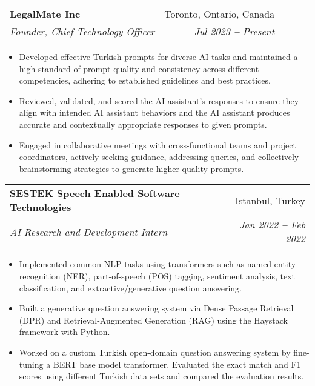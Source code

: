 \documentclass[letterpaper,11pt]{article}
\makeatletter
\newcommand{\resumeItem}[1]{
  \item\small{
    {#1 \vspace{-2pt}}
  }
}
\newcommand{\resumeSubheading}[4]{
  \vspace{-2pt}\item
    \begin{tabular*}{0.97\textwidth}[t]{l@{\extracolsep{\fill}}r}
      \textbf{#1} & #2 \\
      \textit{\small#3} & \textit{\small #4} \\
    \end{tabular*}\vspace{-7pt}
}
\newcommand{\resumeItemListStart}{\begin{itemize}}
\newcommand{\resumeItemListEnd}{\end{itemize}\vspace{-5pt}}
\makeatother
\begin{document}
    \resumeSubheading
      {LegalMate Inc}{Toronto, Ontario, Canada}
      {Founder, Chief Technology Officer}{Jul 2023 \textbf{--} Present}
        \resumeItemListStart
            \resumeItem{Developed effective Turkish prompts for diverse AI tasks and maintained a high standard of prompt quality and consistency across different competencies, adhering to established guidelines and best practices.}
            \resumeItem{Reviewed, validated, and scored the AI assistant's responses to ensure they align with intended AI assistant behaviors and the AI assistant produces accurate and contextually appropriate responses to given prompts.}
            \resumeItem{Engaged in collaborative meetings with cross-functional teams and project coordinators, actively seeking guidance, addressing queries, and collectively brainstorming strategies to generate higher quality prompts.}
        \resumeItemListEnd

    \resumeSubheading
      {SESTEK Speech Enabled Software Technologies}{Istanbul, Turkey}
      {AI Research and Development Intern}{Jan 2022 \textbf{--} Feb 2022}
        \resumeItemListStart
            \resumeItem{Implemented common NLP tasks using transformers such as named-entity recognition (NER), part-of-speech (POS) tagging, sentiment analysis, text classification, and extractive/generative question answering.}
            \resumeItem{Built a generative question answering system via Dense Passage Retrieval (DPR) and Retrieval-Augmented Generation (RAG) using the Haystack framework with Python.}
            \resumeItem{Worked on a custom Turkish open-domain question answering system by fine-tuning a BERT base model transformer. Evaluated the exact match and F1 scores using different Turkish data sets and compared the evaluation results.}
        \resumeItemListEnd

\end{document}

